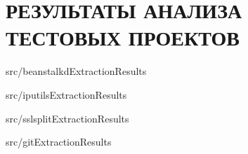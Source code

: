 \chapter{РЕЗУЛЬТАТЫ АНАЛИЗА ТЕСТОВЫХ ПРОЕКТОВ}
\label{app:results}

{src/beanstalkdExtractionResults}


{src/iputilsExtractionResults}


{src/sslsplitExtractionResults}


{src/gitExtractionResults}